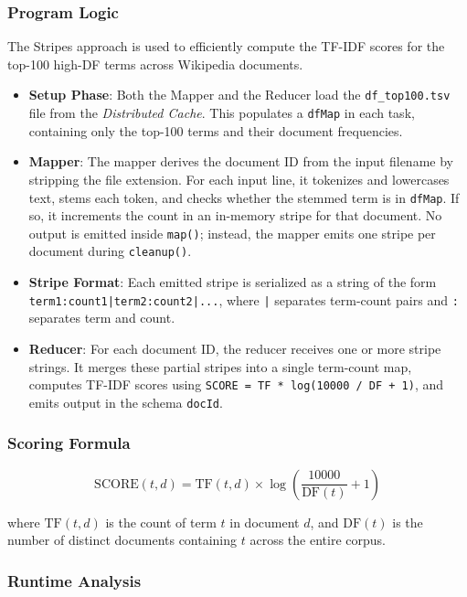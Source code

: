 \documentclass[12pt,a4paper]{article}
\begin{document}
\subsubsection{Program Logic}

The Stripes approach is used to efficiently compute the TF-IDF scores for the top-100 high-DF terms across Wikipedia documents.

\begin{itemize}
    \item \textbf{Setup Phase}: Both the Mapper and the Reducer load the \texttt{df\_top100.tsv} file from the \textit{Distributed Cache}. This populates a \texttt{dfMap} in each task, containing only the top-100 terms and their document frequencies.
    \item \textbf{Mapper}: The mapper derives the document ID from the input filename by stripping the file extension. For each input line, it tokenizes and lowercases text, stems each token, and checks whether the stemmed term is in \texttt{dfMap}. If so, it increments the count in an in-memory stripe for that document. No output is emitted inside \texttt{map()}; instead, the mapper emits one stripe per document during \texttt{cleanup()}.
    \item \textbf{Stripe Format}: Each emitted stripe is serialized as a string of the form \texttt{term1:count1|term2:count2|...}, where \texttt{|} separates term-count pairs and \texttt{:} separates term and count.
    \item \textbf{Reducer}: For each document ID, the reducer receives one or more stripe strings. It merges these partial stripes into a single term-count map, computes TF-IDF scores using \texttt{SCORE = TF * log(10000 / DF + 1)}, and emits output in the schema \texttt{docId\tterm\tscore}.
\end{itemize}

\subsubsection{Scoring Formula}

\[
  \text{SCORE}(t, d)
    = \text{TF}(t, d) \times \log\!\left(\frac{10000}{\text{DF}(t)} + 1\right)
\]

where $\text{TF}(t, d)$ is the count of term $t$ in document $d$, and $\text{DF}(t)$ is the number of distinct documents containing $t$ across the entire corpus.




\subsubsection{Runtime Analysis}
\end{document}
